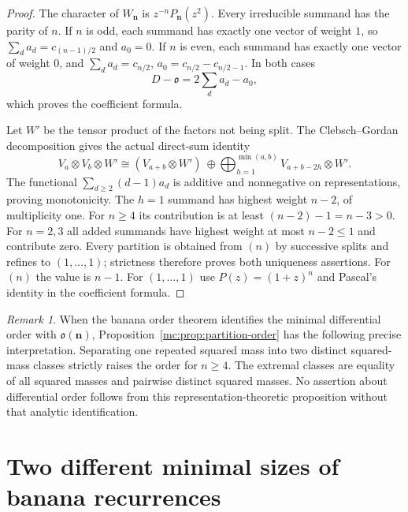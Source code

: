 \documentclass[11pt,a4paper]{article}
\theoremstyle{definition}
\theoremstyle{remark}
\newtheorem{remark}[theorem]{Remark}
\numberwithin{equation}{section}
\begin{document}
\begin{proof}
The character of $W_{\boldsymbol n}$ is $z^{-n}P_{\boldsymbol n}(z^2)$.
Every irreducible summand has the parity of $n$. If $n$ is odd, each
summand has exactly one vector of weight $1$, so
$\sum_d a_d=c_{(n-1)/2}$ and $a_0=0$. If $n$ is even, each summand has
exactly one vector of weight $0$, and
$\sum_d a_d=c_{n/2}$, $a_0=c_{n/2}-c_{n/2-1}$. In both cases
\[
 D-\mathfrak o=2\sum_d a_d-a_0,
\]
which proves the coefficient formula.

Let $W'$ be the tensor product of the factors not being split. The
Clebsch--Gordan decomposition gives the actual direct-sum identity
\[
 V_a\otimes V_b\otimes W'
 \cong (V_{a+b}\otimes W')\ \oplus\!
 \bigoplus_{h=1}^{\min(a,b)}V_{a+b-2h}\otimes W'.
\]
The functional $\sum_{d\ge2}(d-1)a_d$ is additive and nonnegative on
representations, proving monotonicity. The $h=1$ summand has highest
weight $n-2$, of multiplicity one. For $n\ge4$ its contribution is at
least $(n-2)-1=n-3>0$. For $n=2,3$ all added summands have highest
weight at most $n-2\le1$ and contribute zero. Every partition is obtained
from $(n)$ by successive splits and refines to $(1,\ldots,1)$; strictness
therefore proves both uniqueness assertions. For $(n)$ the value is
$n-1$. For $(1,\ldots,1)$ use $P(z)=(1+z)^n$ and Pascal's identity in
the coefficient formula.
\end{proof}

\begin{remark}
When the banana order theorem identifies the minimal differential order
with $\mathfrak o(\boldsymbol n)$, Proposition~\ref{mc:prop:partition-order}
has the following precise interpretation. Separating one repeated squared
mass into two distinct squared-mass classes strictly raises the order for
$n\ge4$. The extremal classes are equality of all squared masses and
pairwise distinct squared masses. No assertion about differential order
follows from this representation-theoretic proposition without that
analytic identification.
\end{remark}

\section{Two different minimal sizes of banana recurrences}
\label{tr:rt-section}
\end{document}
